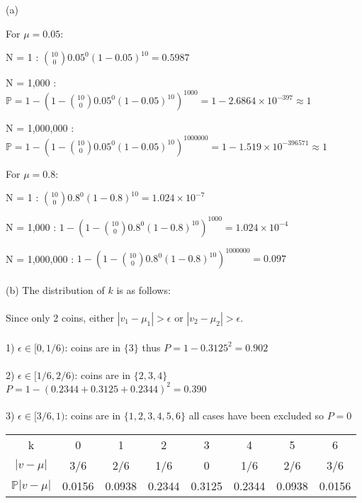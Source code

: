 \documentclass[12pt]{article}
\begin{document}
 \\\\
\indent (a)
\begin{center} For $\mu = 0.05$: \end{center}
\par N = 1 : $\displaystyle {10\choose0}0.05^0(1-0.05)^{10} = 0.5987$
\par N = 1,000 : $\displaystyle \mathbb{P} = 1-(1-{10\choose0}0.05^0(1-0.05)^{10})^{1000} = 1-2.6864\times10^{-397} \approx 1$
\par N = 1,000,000 : $\displaystyle \mathbb{P} = 1-(1-{10\choose0}0.05^0(1-0.05)^{10})^{1000000} = 1-1.519\times10^{-396571} \approx 1$
\begin{center} For $\mu = 0.8$: \end{center}
\par N = 1 : $\displaystyle {10\choose0}0.8^0(1-0.8)^{10} = 1.024\times10^{-7}$
\par N = 1,000 : $\displaystyle 1-(1-{10\choose0}0.8^0(1-0.8)^{10})^{1000} = 1.024\times10^{-4}$
\par N = 1,000,000 : $\displaystyle 1-(1-{10\choose0}0.8^0(1-0.8)^{10})^{1000000} = 0.097$\\\\
\indent (b) The distribution of $k$ is as follows:\\\\
\indent Since only 2 coins, either $|v_1 - \mu_1| > \epsilon$ or $|v_2 - \mu_2| > \epsilon$. \\\\
1) $\epsilon \in [0,1/6)$: coins are in $\{3\}$ thus $P = 1 - 0.3125^2 = 0.902$\\\\
2) $\epsilon \in [1/6,2/6)$: coins are in $\{2,3,4\}$ $P = 1 - (0.2344 + 0.3125 + 0.2344)^2 = 0.390$\\\\
3) $\epsilon \in [3/6,1)$: coins are in $\{1,2,3,4,5,6\}$ all cases have been excluded so $P = 0$
\begin{center}
\begin{tabular}{ |c|c|c|c|c|c|c|c| } 
 \hline
 k & 0 & 1 & 2 & 3 & 4 & 5 & 6 \\ 
 $|v-\mu |$ & 3/6 & 2/6 & 1/6 & 0 & 1/6 & 2/6 & 3/6 \\ 
 $\mathbb{P} |v - \mu|$ & 0.0156 & 0.0938 & 0.2344 & 0.3125 & 0.2344 & 0.0938 & 0.0156 \\ 
 \hline
\end{tabular}
\end{center}
\end{document}

